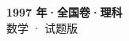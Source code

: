 \documentclass[zihao=-4, a4paper]{ctexart}
\begin{document}
\begin{center}
  {\Large\bfseries 1997 年·全国卷·理科}\\[4pt]
  {\large 数学 · 试题版}
\end{center}
\medskip
{}

\end{document}
